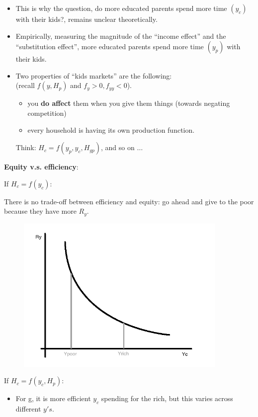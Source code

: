 \documentclass[14pt,notitlepage]{article}
\begin{document}
\begin{itemize}
\item This is why the question, do more educated parents spend more time $(y_c)$ with their kids?, remains unclear theoretically.
\item Empirically, measuring the magnitude of the ``income effect'' and the ``substitution effect'', more educated parents spend more time $(y_p)$ with their kids.
\item Two properties of ``kids markets'' are the following:\\
(recall $f(y,H_p)$ and $f_y >0, f_{yy} <0$).
    \begin{itemize}
    \item you \textbf{do affect} them when you give them things (towards negating competition)
    \item every household is having its own production function. \\
    \end{itemize}
Think: $H_c = f(y_p, y_c, H_{gp})$, and so on $\ldots$
\end{itemize}

\textbf{Equity v.s. efficiency}:

If $H_c= f(y_c)$: 

There is no trade-off between efficiency and equity: go ahead and give to the poor \\
because they have more $R_y$.

\begin{center}
\begin{figure}[H] 
\caption{}
\centering
\includegraphics[width=4in, height=3in]{plot5.png}
\end{figure}
\end{center}


If $H_c = f(y_c, H_p)$:
\begin{itemize}
\item For g, it is more efficient $y_c$ spending for the rich, but this varies across different $y's$.
\end{itemize}
\end{document}
